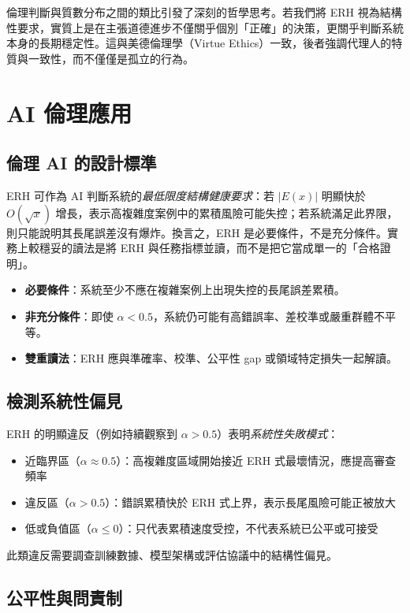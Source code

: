 \documentclass[12pt,a4paper]{article}
\theoremstyle{definition}
\theoremstyle{remark}
\begin{document}
倫理判斷與質數分布之間的類比引發了深刻的哲學思考。若我們將 ERH 視為結構性要求，實質上是在主張道德進步不僅關乎個別「正確」的決策，更關乎判斷系統本身的長期穩定性。這與美德倫理學（Virtue Ethics）一致，後者強調代理人的特質與一致性，而不僅僅是孤立的行為。

\section{AI 倫理應用}
\label{sec:implications}

\subsection{倫理 AI 的設計標準}

ERH 可作為 AI 判斷系統的\emph{最低限度結構健康要求}：若 $|E(x)|$ 明顯快於 $O(\sqrt{x})$ 增長，表示高複雜度案例中的累積風險可能失控；若系統滿足此界限，則只能說明其長尾誤差沒有爆炸。換言之，ERH 是必要條件，不是充分條件。實務上較穩妥的讀法是將 ERH 與任務指標並讀，而不是把它當成單一的「合格證明」。

\begin{itemize}
    \item \textbf{必要條件}：系統至少不應在複雜案例上出現失控的長尾誤差累積。
    \item \textbf{非充分條件}：即使 $\alpha < 0.5$，系統仍可能有高錯誤率、差校準或嚴重群體不平等。
    \item \textbf{雙重讀法}：ERH 應與準確率、校準、公平性 gap 或領域特定損失一起解讀。
\end{itemize}

\subsection{檢測系統性偏見}

ERH 的明顯違反（例如持續觀察到 $\alpha > 0.5$）表明\emph{系統性失敗模式}：
\begin{itemize}
    \item 近臨界區（$\alpha \approx 0.5$）：高複雜度區域開始接近 ERH 式最壞情況，應提高審查頻率
    \item 違反區（$\alpha > 0.5$）：錯誤累積快於 ERH 式上界，表示長尾風險可能正被放大
    \item 低或負值區（$\alpha \leq 0$）：只代表累積速度受控，不代表系統已公平或可接受
\end{itemize}

此類違反需要調查訓練數據、模型架構或評估協議中的結構性偏見。

\subsection{公平性與問責制}
\end{document}
